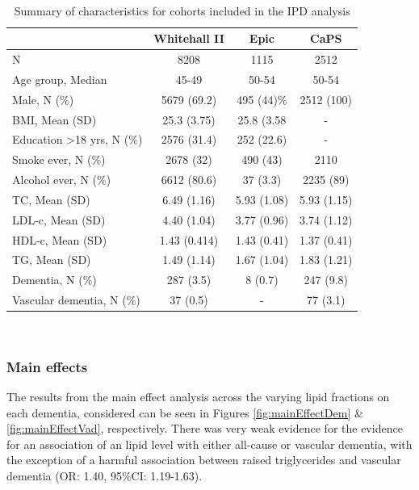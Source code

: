 \documentclass[a4paper, twoside]{templates/ociamthesis}
\begin{document}
~





\begin{table}[H]

\caption[Summary of characteristics of IPD cohorts]{\label{tab:covariateSummary-table}Summary of characteristics for cohorts included in the IPD analysis}
\centering
\begin{tabular}[t]{>{}lccc}
\toprule
\textbf{ } & \textbf{Whitehall II} & \textbf{Epic} & \textbf{CaPS}\\
\midrule
N & 8208 & 1115 & 2512\\
\midrule
Age group, Median & 45-49 & 50-54 & 50-54\\
\midrule
Male, N (\%) & 5679 (69.2) & 495 (44)\% & 2512 (100)\\
\midrule
BMI, Mean (SD) & 25.3 (3.75) & 25.8 (3.58 & -\\
\midrule
Education >18 yrs, N (\%) & 2576 (31.4) & 252 (22.6) & -\\
\midrule
\addlinespace
Smoke ever, N (\%) & 2678 (32) & 490 (43) & 2110\\
\midrule
Alcohol ever, N (\%) & 6612 (80.6) & 37 (3.3) & 2235 (89)\\
\midrule
TC, Mean (SD) & 6.49 (1.16) & 5.93 (1.08) & 5.93 (1.15)\\
\midrule
LDL-c, Mean (SD) & 4.40 (1.04) & 3.77 (0.96) & 3.74 (1.12)\\
\midrule
HDL-c, Mean (SD) & 1.43 (0.414) & 1.43 (0.41) & 1.37 (0.41)\\
\midrule
\addlinespace
TG, Mean (SD) & 1.49 (1.14) & 1.67 (1.04) & 1.83 (1.21)\\
\midrule
Dementia, N (\%) & 287 (3.5) & 8 (0.7) & 247 (9.8)\\
\midrule
Vascular dementia, N (\%) & 37 (0.5) & - & 77 (3.1)\\
\bottomrule
\end{tabular}
\end{table}

~

\hypertarget{main-effects}{%
\subsubsection{Main effects}\label{main-effects}}

The results from the main effect analysis across the varying lipid fractions on each dementia, considered can be seen in Figures \ref{fig:mainEffectDem} \& \ref{fig:mainEffectVad}, respectively. There was very weak evidence for the evidence for an association of an lipid level with either all-cause or vascular dementia, with the exception of a harmful association between raised triglycerides and vascular dementia (OR: 1.40, 95\%CI: 1.19-1.63).
\end{document}
